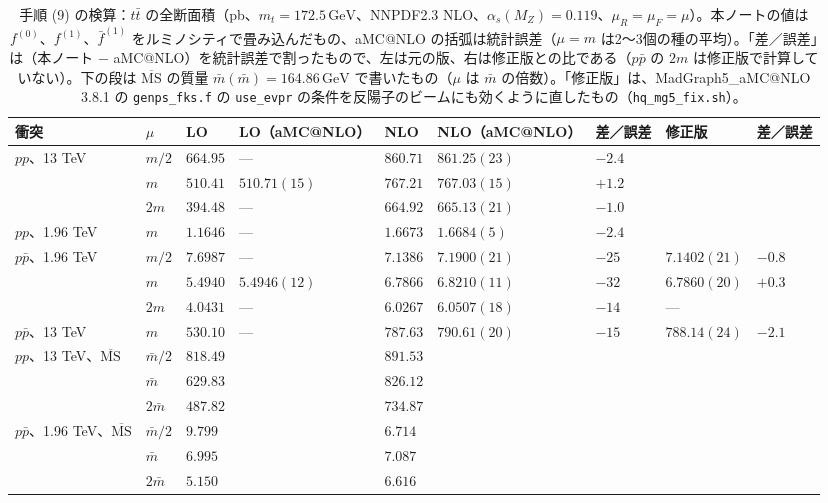 \documentclass[a4paper,10pt]{ltjsarticle}
\newcommand{\MSbar}{\overline{\mathrm{MS}}}
\begin{document}
\begin{table}[tbp]
\centering\footnotesize\setlength{\tabcolsep}{4pt}
\caption{手順 (9) の検算：$t\bar t$ の全断面積（pb、$m_t=172.5\,\mathrm{GeV}$、NNPDF2.3 NLO、$\alpha_s(M_Z)=0.119$、$\mu_R=\mu_F=\mu$）。本ノートの値は $f^{(0)}$、$f^{(1)}$、$\bar f^{(1)}$ をルミノシティで畳み込んだもの、aMC@NLO の括弧は統計誤差（$\mu=m$ は2〜3個の種の平均）。「差／誤差」は（本ノート $-$ aMC@NLO）を統計誤差で割ったもので、左は元の版、右は修正版との比である（$p\bar p$ の $2m$ は修正版で計算していない）。下の段は $\MSbar$ の質量 $\bar m(\bar m)=164.86\,\mathrm{GeV}$ で書いたもの（$\mu$ は $\bar m$ の倍数）。「修正版」は、MadGraph5\_aMC@NLO 3.8.1 の \texttt{genps\_fks.f} の \texttt{use\_evpr} の条件を反陽子のビームにも効くように直したもの（\texttt{hq\_mg5\_fix.sh}）。}
\label{tab:had}
\begin{tabular}{lllllllll}
\toprule
衝突 & $\mu$ & LO & LO（aMC@NLO） & NLO & NLO（aMC@NLO） & 差／誤差 & 修正版 & 差／誤差 \\
\midrule
$pp$、13 TeV & $m/2$ & $664.95$ & — & $860.71$ & $861.25(23)$ & $-2.4$ & & \\
 & $m$ & $510.41$ & $510.71(15)$ & $767.21$ & $767.03(15)$ & $+1.2$ & & \\
 & $2m$ & $394.48$ & — & $664.92$ & $665.13(21)$ & $-1.0$ & & \\
$pp$、1.96 TeV & $m$ & $1.1646$ & — & $1.6673$ & $1.6684(5)$ & $-2.4$ & & \\
$p\bar p$、1.96 TeV & $m/2$ & $7.6987$ & — & $7.1386$ & $7.1900(21)$ & $-25$ & $7.1402(21)$ & $-0.8$ \\
 & $m$ & $5.4940$ & $5.4946(12)$ & $6.7866$ & $6.8210(11)$ & $-32$ & $6.7860(20)$ & $+0.3$ \\
 & $2m$ & $4.0431$ & — & $6.0267$ & $6.0507(18)$ & $-14$ & — & \\
$p\bar p$、13 TeV & $m$ & $530.10$ & — & $787.63$ & $790.61(20)$ & $-15$ & $788.14(24)$ & $-2.1$ \\
\midrule
$pp$、13 TeV、$\MSbar$ & $\bar m/2$ & $818.49$ & & $891.53$ & & & & \\
 & $\bar m$ & $629.83$ & & $826.12$ & & & & \\
 & $2\bar m$ & $487.82$ & & $734.87$ & & & & \\
$p\bar p$、1.96 TeV、$\MSbar$ & $\bar m/2$ & $9.799$ & & $6.714$ & & & & \\
 & $\bar m$ & $6.995$ & & $7.087$ & & & & \\
 & $2\bar m$ & $5.150$ & & $6.616$ & & & & \\
\bottomrule
\end{tabular}
\end{table}
\end{document}
